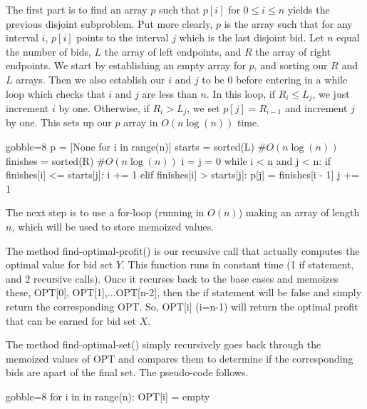 \documentclass[10pt]{article}\usepackage[]{graphicx}\usepackage[]{xcolor}
\begin{document}
\begin{easylist}[enumerate]
    The first part is to find an array $p$ such that $p[i]$ for $0 \le i \le n$ yields the previous disjoint subproblem.
    Put more clearly, $p$ is the array such that for any interval $i$, $p[i]$ points to the interval $j$ which is the
    last disjoint bid. Let $n$ equal the number of bids, $L$ the array of left endpoints, and $R$ the array of right
    endpoints. We start by establishing an empty array for $p$, and sorting our $R$ and $L$ arrays. Then we also
    establish our $i$ and $j$ to be 0 before entering in a while loop which checks that $i$ and $j$ are less than $n$.
    In this loop, if $R_i \le L_j$, we just increment $i$ by one. Otherwise, if $R_i > L_j$, we set $p[j] = R_{i-1}$ and
    increment $j$ by one. This sets up our $p$ array in $O(n \log(n))$ time.

    \begin{pythoncode*}{gobble=8}
        p        = [None for i in range(n)]
        starts   = sorted(L)   #$O\left(n\log(n)\right)$
        finishes = sorted(R)   #$O\left(n\log(n)\right)$
        i = j = 0
        while i < n and j < n:
            if finishes[i] <= starts[j]:
                i += 1
            elif finishes[i] > starts[j]:
                p[j] = finishes[i - 1]
                j += 1
    \end{pythoncode*}

    The next step is to use a {\ttfamily for-loop} (running in $O(n)$) making an array of length $n$, which will be used
    to store memoized values.\newline

    The method {\ttfamily find-optimal-profit()} is our recursive call that actually computes the optimal value for bid
    set $Y$.  This function runs in constant time (1 if statement, and 2 recursive calls).  Once it recurses back to the
    base cases and memoizes these, {\ttfamily OPT[0], OPT[1],...OPT[n-2]}, then the {\ttfamily if} statement will be
    false and simply return the corresponding {\ttfamily OPT}.  So, {\ttfamily OPT[i] (i=n-1)} will return the optimal
    profit that can be earned for bid set $X$.\newline

    The method {\ttfamily find-optimal-set()} simply recursively goes back through the memoized values of {\ttfamily
    OPT} and compares them to determine if the corresponding bids are apart of the final set. The pseudo-code follows.

    \begin{pythoncode*}{gobble=8}
        for i in in range(n):
            OPT[i] = empty


\end{pythoncode*}
\end{easylist}
\end{document}
